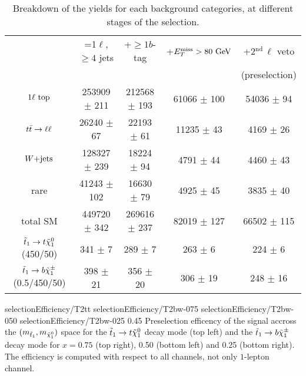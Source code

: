         \begin{table}[h!]
            \hspace*{-0.3cm}
            \begin{tabular}{|c|cccc|}
                \hline
                                             & =1$\ell$, $\geq 4$ jets   & +$\geq 1b$-tag     & +$E_T^\text{miss} > 80 ~\text{GeV}$ &  +2$^\text{nd}\, \ell$ veto \\
                                             &                           &                    &                   & (preselection) \\
                \hline                       
                $1\ell~\text{top}$              & 253909 $\pm$ 211          & 212568 $\pm$ 193   &  61066 $\pm$ 100  & 54036 $\pm$ 94     \\
                $t\bar{t} \rightarrow \ell \ell$               &  26240 $\pm$ 67           &  22193 $\pm$ 61    &  11235 $\pm$ 43   &  4169 $\pm$ 26     \\
                $\text{$W$+jets}$                     & 128327 $\pm$ 239          &  18224 $\pm$ 94    &   4791 $\pm$ 44   &  4460 $\pm$ 43     \\
                rare                         &  41243 $\pm$ 102          &  16630 $\pm$ 79    &   4925 $\pm$ 45   &  3835 $\pm$ 40     \\
                \hline                                                                        
                total SM                     & 449720 $\pm$ 342          & 269616 $\pm$ 237   &  82019 $\pm$ 127  & 66502 $\pm$ 115    \\
                \hline
$\tilde{t}_1 \rightarrow t \tilde{\chi}_1^0$   (450/50) & 341 $\pm$ 7               & 289 $\pm$ 7        & 263 $\pm$ 6       & 224 $\pm$ 6        \\ 
$\tilde{t}_1 \rightarrow b \tilde{\chi}_1^\pm$ (0.5/450/50) & 398 $\pm$ 21              & 356 $\pm$ 20       & 306 $\pm$ 19      & 248 $\pm$ 16       \\
                \hline
            \end{tabular}
            \caption{Breakdown of the yields for each background categories, at different stages of the selection.}
            \label{tab:cutflowPreselection}
        \end{table}

                          {selectionEfficiency/T2tt}
                          {selectionEfficiency/T2bw-075}
                          {selectionEfficiency/T2bw-050}
                          {selectionEfficiency/T2bw-025}
                          {0.45}
                          {Preselection efficency of the signal accross the $(m_{\tilde{t}_1},
                          m_{\tilde{\chi}_1^0})$ space for the $\tilde{t}_1 \rightarrow t \tilde{\chi}_1^0$ 
                          decay mode (top left) and the $\tilde{t}_1 \rightarrow b \tilde{\chi}_1^\pm$ 
                          decay mode for $x = 0.75$ (top right), 0.50 (bottom left) and 0.25 
                          (bottom right). The efficiency is computed with respect to all 
                          channels, not only $1$-lepton channel.}


